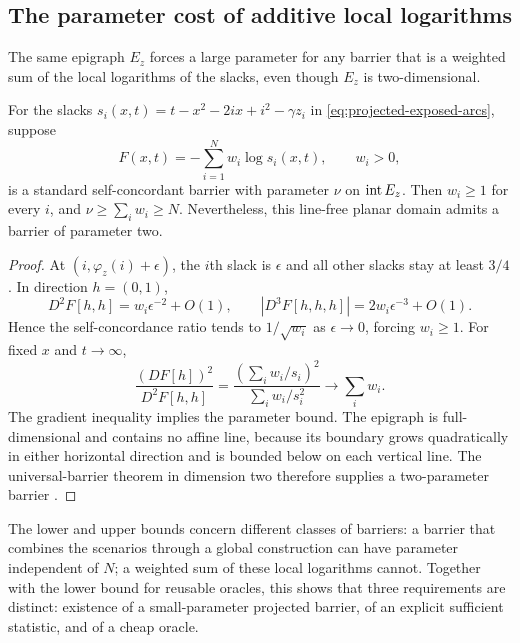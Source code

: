 \subsection{The parameter cost of additive local logarithms}

The same epigraph $E_z$ forces a large parameter for any barrier that is
a weighted sum of the local logarithms of the slacks, even though $E_z$
is two-dimensional.

\begin{proposition}\label{prop:projected-local-barrier}
For the slacks
$s_i(x,t)=t-x^2-2ix+i^2-\gamma z_i$ in
\eqref{eq:projected-exposed-arcs}, suppose
\[
 F(x,t)=-\sum_{i=1}^N w_i\log s_i(x,t),\qquad w_i>0,
\]
is a standard self-concordant barrier with parameter $\nu$ on
$\operatorname{int} E_z$.  Then $w_i\geq1$ for every $i$, and $\nu\geq\sum_iw_i\geq N$.
Nevertheless, this line-free planar domain admits a barrier of parameter
two.
\end{proposition}
\begin{proof}
At $(i,\varphi_z(i)+\epsilon)$, the $i$th slack is $\epsilon$ and all
other slacks stay at least $3/4$.  In direction $h=(0,1)$,
\[
 D^2F[h,h]=w_i\epsilon^{-2}+O(1),\qquad
 |D^3F[h,h,h]|=2w_i\epsilon^{-3}+O(1).
\]
Hence the self-concordance ratio tends to
$1/\sqrt{w_i}$ as $\epsilon\to0$, forcing $w_i\geq1$.
For fixed $x$ and $t\to\infty$,
\[
 \frac{(DF[h])^2}{D^2F[h,h]}
 =\frac{(\sum_iw_i/s_i)^2}{\sum_iw_i/s_i^2}
 \longrightarrow\sum_iw_i.
\]
The gradient inequality implies the parameter bound.
The epigraph is full-dimensional and contains no affine line, because its
boundary grows quadratically in either horizontal direction and is bounded
below on each vertical line.  The universal-barrier theorem in dimension
two therefore supplies a two-parameter barrier \citep{LeeYue2021}.
\end{proof}

The lower and upper bounds concern different classes of barriers: a
barrier that combines the scenarios through a global construction can
have parameter independent of $N$; a weighted sum of these local
logarithms cannot.  Together with the lower bound for reusable oracles,
this shows that three requirements are distinct: existence of a
small-parameter projected barrier, of an explicit sufficient statistic,
and of a cheap oracle.

